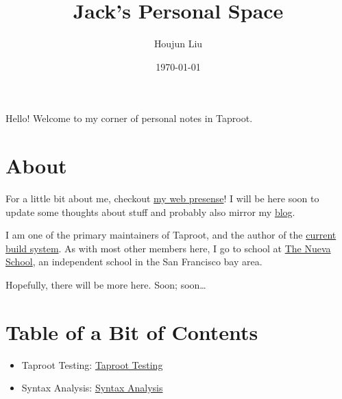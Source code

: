 \documentclass[letterpaper]{article}
\author{Houjun Liu}
\date{\today}
\title{Jack's Personal Space}
\renewcommand\maketitle{}
\begin{document}
\maketitle
Hello! Welcome to my corner of personal notes in Taproot.

\section{About}
\label{sec:org708eff5}
For a little bit about me, checkout \href{https://www.jemoka.com/}{my web presense}! I will be here soon to update some thoughts about stuff and probably also mirror my \href{https://medium.com/20minuterants}{blog}.

I am one of the primary maintainers of Taproot, and the author of the \href{https://github.com/InSanityHQ/taproot3/}{current build system}. As with most other members here, I go to school at \href{https://www.nuevaschool.org}{The Nueva School}, an independent school in the San Francisco bay area.

Hopefully, there will be more here. Soon; soon\ldots{}

\section{Table of a Bit of Contents}
\label{sec:orgd431cf2}
\begin{itemize}
\item Taproot Testing: \href{./KBhTaprootTesting.org}{Taproot Testing}
\item Syntax Analysis: \href{./KBhSyntaxAnalysis.org}{Syntax Analysis}
\end{itemize}
\end{document}
